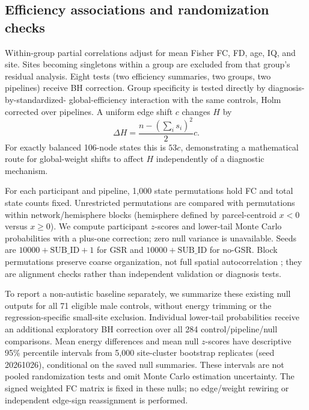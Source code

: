 \documentclass[10pt,letterpaper]{article}
\begin{document}
\subsection*{Efficiency associations and randomization checks}
Within-group partial correlations adjust for mean Fisher FC, FD, age, IQ, and site.
Sites becoming singletons within a group are excluded from that group's residual
analysis. Eight tests (two efficiency summaries, two groups, two pipelines) receive
BH correction. Group specificity is tested directly by diagnosis-by-standardized-
global-efficiency interaction with the same controls, Holm corrected over pipelines.
A uniform edge shift $c$ changes $H$ by
\begin{equation}
\Delta H=\frac{n-(\sum_i s_i)^2}{2}c.
\end{equation}
For exactly balanced 106-node states this is $53c$, demonstrating a mathematical
route for global-weight shifts to affect $H$ independently of a diagnostic mechanism.

For each participant and pipeline, 1,000 state permutations hold FC and total state
counts fixed. Unrestricted permutations are compared with permutations within
network/hemisphere blocks (hemisphere defined by parcel-centroid $x<0$ versus
$x\geq0$). We compute participant $z$-scores and lower-tail Monte Carlo probabilities
with a plus-one correction; zero null variance is unavailable. Seeds are
$10000+\mathrm{SUB\_ID}+1$ for GSR and $10000+\mathrm{SUB\_ID}$ for no-GSR.
Block permutations preserve coarse organization, not full spatial autocorrelation
\cite{Markello2021revision}; they are alignment checks rather than independent
validation or diagnosis tests.

To report a non-autistic baseline separately, we summarize these existing null
outputs for all 71 eligible male controls, without energy trimming or the
regression-specific small-site exclusion. Individual lower-tail probabilities
receive an additional exploratory BH correction over all 284 control/pipeline/null
comparisons. Mean energy differences and mean null $z$-scores have descriptive
95\% percentile intervals from 5,000 site-cluster bootstrap replicates
(seed 20261026), conditional on the saved null summaries. These intervals are
not pooled randomization tests and omit Monte Carlo estimation uncertainty.
The signed weighted FC matrix is fixed in these nulls; no edge/weight rewiring
or independent edge-sign reassignment is performed.
\end{document}
